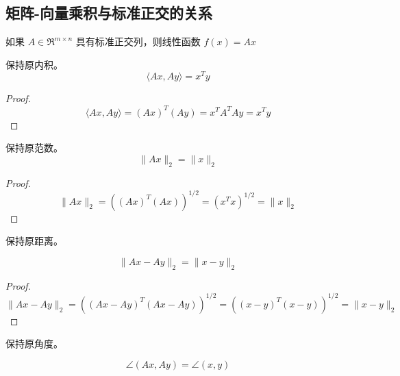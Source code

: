 \subsection{矩阵-向量乘积与标准正交的关系}

如果 $ A \in \mathfrak{R}^{m \times n} $ 具有标准正交列，则线性函数 $ f(x)=A x $

\begin{theorem}
    保持原内积。
    \begin{equation} \langle A x, A y\rangle=x^{T} y \end{equation}
\end{theorem}

\begin{proof}
    \begin{equation} \langle A x, A y\rangle=(A x)^{T}(A y)=x^{T} A^{T} A y=x^{T} y \end{equation}
\end{proof}


\begin{theorem}
    保持原范数。
    \begin{equation}
    \|A x\|_{2}=\|x\|_{2}
    \end{equation}
\end{theorem}

\begin{proof}
   \begin{equation}
\|A x\|_{2}=\left((A x)^{T}(A x)\right)^{1 / 2}=\left(x^{T} x\right)^{1 / 2}=\|x\|_{2}
\end{equation}
\end{proof}

\begin{theorem}
    保持原距离。

    \begin{equation}
    \|A x-A y\|_{2}=\|x-y\|_{2}
    \end{equation}
\end{theorem}

\begin{proof}
   \begin{equation}
\|A x-A y\|_{2}=\left((A x-A y)^{T}(A x-A y)\right)^{1 / 2}=\left((x-y)^{T}(x-y)\right)^{1 / 2}=\|x-y\|_{2}
\end{equation}
\end{proof}

\begin{theorem}
    保持原角度。

    \begin{equation} \angle(A x, A y)=\angle(x, y) \end{equation}
\end{theorem}


